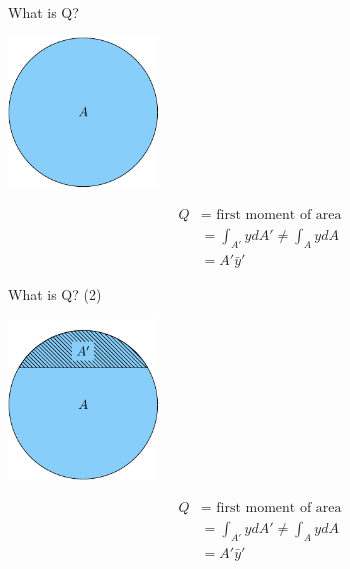 \documentclass[10pt, svgnames]{beamer}
\begin{document}
\begin{frame}[label={sec:org06a6077}]{What is Q?}
\begin{center}
\includegraphics[width=0.3\textwidth]{pictures/first-moment.pdf}
\end{center}

\begin{align*}
    Q &= \text{ first moment of area} \\
      &= \int_{A'} ydA' \neq \int_A ydA \\
      &= A'\bar{y}'
\end{align*}
\end{frame}

\begin{frame}[label={sec:orgfe2e92e}]{What is Q? (2)}
\begin{center}
\includegraphics[width=0.3\textwidth]{pictures/first-moment-2.pdf}
\end{center}

\begin{align*}
    Q &= \text{ first moment of area} \\
      &= \int_{A'} ydA' \neq \int_A ydA \\
      &= A'\bar{y}'
\end{align*}
\end{frame}
\end{document}
